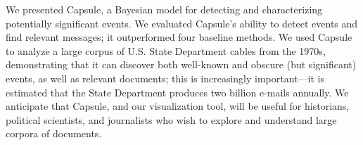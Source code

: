 
We presented Capsule, a Bayesian model for detecting and
characterizing potentially significant events. We evaluated Capsule's
ability to detect events and find relevant messages; it outperformed four 
baseline methods. We used Capsule to analyze a large corpus of U.S. State 
Department cables from the 1970s, demonstrating 
that it can discover both well-known and obscure (but 
significant) events, as well as relevant documents;
this is increasingly important---it
is estimated that the State Department 
produces two billion e-mails annually. 
We anticipate that Capsule, and our
visualization tool, will be useful for historians, political
scientists, and journalists who wish to explore and understand large
corpora of documents.
